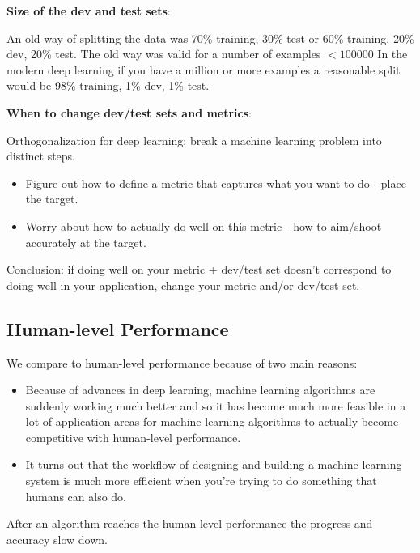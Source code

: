 \documentclass{article}
\begin{document}
\bigskip

\noindent \textbf{Size of the dev and test sets}:

\noindent An old way of splitting the data was 70\% training, 30\% test or 60\% training, 20\% dev, 20\% test. The old way was valid for a number of examples \(< 100000\) In the modern deep learning if you have a million or more examples a reasonable split would be 98\% training, 1\% dev, 1\% test.

\bigskip

\noindent \textbf{When to change dev/test sets and metrics}:

\noindent Orthogonalization for deep learning: break a machine learning problem into distinct steps.

\begin{itemize}
    \item Figure out how to define a metric that captures what you want to do - place the target.
    \item Worry about how to actually do well on this metric - how to aim/shoot accurately at the target.
\end{itemize}

\noindent Conclusion: if doing well on your metric + dev/test set doesn't correspond to doing well in your application, change your metric and/or dev/test set.

\subsection{Human-level Performance}

\noindent We compare to human-level performance because of two main reasons:

\begin{itemize}
    \item Because of advances in deep learning, machine learning algorithms are suddenly working much better and so it has become much more feasible in a lot of application areas for machine learning algorithms to actually become competitive with human-level performance.
    \item It turns out that the workflow of designing and building a machine learning system is much more efficient when you're trying to do something that humans can also do.
\end{itemize}

\noindent After an algorithm reaches the human level performance the progress and accuracy slow down.
\end{document}
